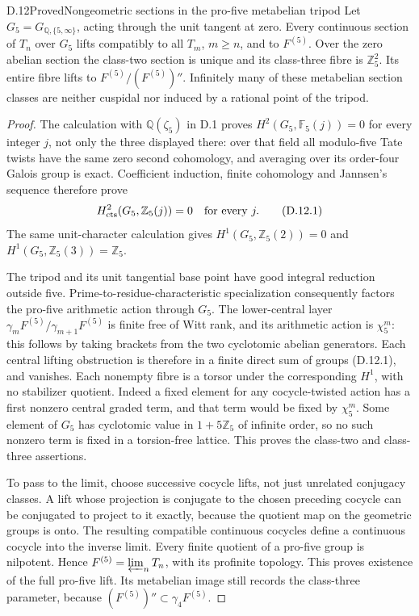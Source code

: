 \begin{statement}{D.12}{Proved}{Nongeometric sections in the pro-five metabelian tripod}
Let \(G_5=G_{\mathbb Q,\{5,\infty\}}\), acting through the
unit tangent at zero. Every continuous section of \(T_n\)
over \(G_5\) lifts compatibly to all \(T_m\), \(m\ge n\),
and to \(F^{(5)}\). Over the zero abelian section the
class-two section is unique and its class-three fibre is
\(\mathbb Z_5^2\). Its entire fibre lifts to
\(F^{(5)}/(F^{(5)})''\). Infinitely many of these metabelian
section classes are neither cuspidal nor induced by a
rational point of the tripod.
\end{statement}
\begin{proof}
The calculation with \(\mathbb Q(\zeta_5)\) in D.1 proves
\(H^2(G_5,\mathbb F_5(j))=0\) for every integer \(j\),
not only the three displayed there: over that field all
modulo-five Tate twists have the same zero second cohomology,
and averaging over its order-four Galois group is exact.
Coefficient induction, finite cohomology and Jannsen's
sequence therefore prove
\[
 H^2_{\rm cts}(G_5,\mathbb Z_5(j))=0
 \quad\text{for every }j.                              \tag{D.12.1}
\]
The same unit-character calculation gives
\(H^1(G_5,\mathbb Z_5(2))=0\) and
\(H^1(G_5,\mathbb Z_5(3))=\mathbb Z_5\).

The tripod and its unit tangential base point have good
integral reduction outside five. Prime-to-residue-characteristic
specialization consequently factors the pro-five arithmetic
action through \(G_5\). The lower-central layer
\(\gamma_mF^{(5)}/\gamma_{m+1}F^{(5)}\) is finite free
of Witt rank, and its arithmetic action is \(\chi_5^m\):
this follows by taking brackets from the two cyclotomic
abelian generators. Each central lifting obstruction is
therefore in a finite direct sum of groups (D.12.1), and
vanishes. Each nonempty fibre is a torsor under the
corresponding \(H^1\), with no stabilizer quotient. Indeed
a fixed element for any cocycle-twisted action has a first
nonzero central graded term, and that term would be fixed
by \(\chi_5^m\). Some element of \(G_5\) has cyclotomic
value in \(1+5\mathbb Z_5\) of infinite order, so no such
nonzero term is fixed in a torsion-free lattice.
This proves the class-two and class-three assertions.

To pass to the limit, choose successive cocycle lifts, not
just unrelated conjugacy classes. A lift whose projection
is conjugate to the chosen preceding cocycle can be
conjugated to project to it exactly, because the quotient
map on the geometric groups is onto. The resulting
compatible continuous cocycles define a continuous cocycle
into the inverse limit. Every finite quotient of a pro-five
group is nilpotent. Hence
\(F^{(5)}=\varprojlim_nT_n\), with its profinite topology.
This proves existence of the full pro-five lift. Its
metabelian image still records the class-three parameter,
because \((F^{(5)})''\subset\gamma_4F^{(5)}\).


\end{proof}
